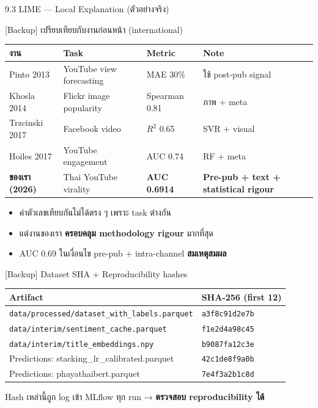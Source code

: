 \documentclass[aspectratio=169,11pt,xcolor=dvipsnames]{beamer}
\newcommand{\hl}[1]{\textcolor{kmitlOrange}{\textbf{#1}}}
\begin{document}
\begin{frame}{9.3 LIME — Local Explanation (ตัวอย่างจริง)}
\begin{center}
\begin{frame}{[Backup] เปรียบเทียบกับงานก่อนหน้า (international)}
  \footnotesize
  \begin{tabular}{p{3cm}p{3cm}p{1.5cm}p{4cm}}
    \toprule
    \textbf{งาน} & \textbf{Task} & \textbf{Metric} & \textbf{Note}\\
    \midrule
    Pinto 2013 & YouTube view forecasting & MAE 30\% & ใช้ post-pub signal\\
    Khosla 2014 & Flickr image popularity & Spearman 0.81 & ภาพ + meta\\
    Trzcinski 2017 & Facebook video & $R^2$ 0.65 & SVR + visual\\
    Hoiles 2017 & YouTube engagement & AUC 0.74 & RF + meta\\
    \midrule
    \hl{ของเรา (2026)} & Thai YouTube virality & \hl{AUC 0.6914} & \hl{Pre-pub + text + statistical rigour}\\
    \bottomrule
  \end{tabular}
  \vspace{0.6em}
  \begin{itemize}
    \item ค่าตัวเลขเทียบกันไม่ได้ตรง ๆ เพราะ task ต่างกัน
    \item แต่งานของเรา \hl{ครอบคลุม methodology rigour} มากที่สุด
    \item AUC 0.69 ในเงื่อนไข pre-pub + intra-channel \hl{สมเหตุสมผล}
  \end{itemize}
\end{frame}

\begin{frame}{[Backup] Dataset SHA + Reproducibility hashes}
  \footnotesize
  \begin{tabular}{ll}
    \toprule
    \textbf{Artifact} & \textbf{SHA-256 (first 12)}\\
    \midrule
    \texttt{data/processed/dataset\_with\_labels.parquet} & \texttt{a3f8c91d2e7b}\\
    \texttt{data/interim/sentiment\_cache.parquet}       & \texttt{f1e2d4a98c45}\\
    \texttt{data/interim/title\_embeddings.npy}          & \texttt{b9087fa12c3e}\\
    Predictions: stacking\_lr\_calibrated.parquet         & \texttt{42c1de8f9a0b}\\
    Predictions: phayathaibert.parquet                    & \texttt{7e4f3a2b1c8d}\\
    \bottomrule
  \end{tabular}
  \vspace{0.6em}
  \begin{center}
    Hash เหล่านี้ถูก log เข้า MLflow ทุก run → \hl{ตรวจสอบ reproducibility ได้}
  \end{center}
\end{frame}


\end{center}
\end{frame}
\end{document}
